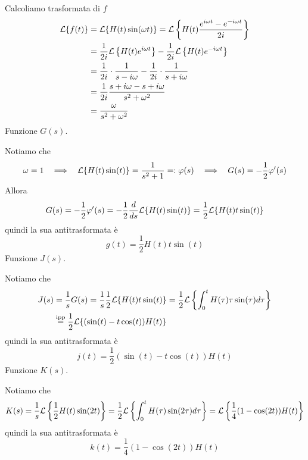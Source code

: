 Calcoliamo trasformata di $f$
\begin{align*}
\mathcal{L}\{f(t)\} & = \mathcal{L}\{H(t)\sin(\omega t)\} = \mathcal{L}\left\{H(t)\frac{e^{i\omega t} - e^{ - i\omega t}}{2i}\right\}\\
 & = \frac{1}{2i}\mathcal{L}\left\{H(t) e^{i\omega t}\right\} - \frac{1}{2i}\mathcal{L}\left\{H(t) e^{ - i\omega t}\right\}\\
 & = \frac{1}{2i} \cdot \frac{1}{s - i\omega } - \frac{1}{2i} \cdot \frac{1}{s + i\omega }\\
 & = \frac{1}{2i}\frac{s + i\omega - s + i\omega }{s^{2} + \omega ^{2}}\\
 & = \frac{\omega }{s^{2} + \omega ^{2}}
\end{align*}
Funzione $G(s)$.

Notiamo che
\begin{equation*}
\omega = 1\ \ \implies \ \ \Lc\{H(t)\sin(t)\} = \frac{1}{s^{2} + 1} = :\varphi (s) \ \ \implies \ \ G(s) = - \frac{1}{2} \varphi '(s)
\end{equation*}
Allora
\begin{equation*}
G(s) = - \frac{1}{2} \varphi '(s) = - \frac{1}{2}\frac{d}{ds}\mathcal{L}\{H(t)\sin(t)\} = \frac{1}{2}\mathcal{L}\{H(t) t\sin(t)\}
\end{equation*}
quindi la sua antitrasformata è
\begin{equation*}
g(t) = \frac{1}{2} H(t) t\sin(t)
\end{equation*}
Funzione $J(s)$.

Notiamo che
\begin{align*}
J(s) & = \frac{1}{s} G(s) = \frac{1}{s}\frac{1}{2}\mathcal{L}\{H(t) t\sin(t)\} = \frac{1}{2}\mathcal{L}\left\{\int ^{t}_{0} H(\tau) \tau \sin(\tau) d\tau \right\}\\
 & \overset{\text{ipp}}{ = }\frac{1}{2}\mathcal{L}\{(\sin(t) - t\cos(t)) H(t)\}
\end{align*}
quindi la sua antitrasformata è
\begin{equation*}
j(t) = \frac{1}{2}(\sin(t) - t\cos(t)) H(t)
\end{equation*}
Funzione $K(s)$.

Notiamo che
\begin{equation*}
K(s) = \frac{1}{s}\mathcal{L}\left\{\frac{1}{2}H(t)\sin(2t)\right\} = \frac{1}{2}\mathcal{L}\left\{\int ^{t}_{0} H(\tau)\sin(2\tau) d\tau \right\} = \mathcal{L}\left\{\frac{1}{4}(1 - \cos(2t)) H(t)\right\}
\end{equation*}
quindi la sua antitrasformata è
\begin{equation*}
k(t) = \frac{1}{4}(1 - \cos(2t)) H(t)
\end{equation*}
